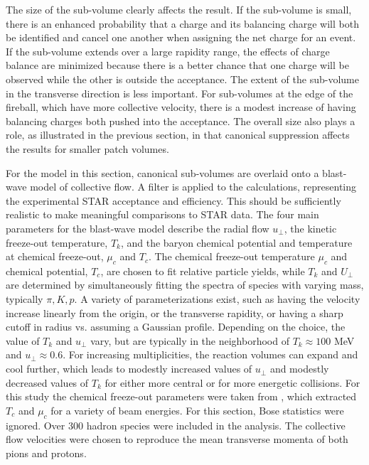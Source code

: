 The size of the sub-volume clearly affects the result. If the sub-volume is small, there is an enhanced probability that a charge and its balancing charge will both be identified and cancel one another when assigning the net charge for an event. If the sub-volume extends over a large rapidity range, the effects of charge balance are minimized because there is a better chance that one charge will be observed while the other is outside the acceptance. The extent of the sub-volume in the transverse direction is less important. For sub-volumes at the edge of the fireball, which have more collective velocity, there is a modest increase of having balancing charges both pushed into the acceptance. The overall size also plays a role, as illustrated in the previous section, in that canonical suppression affects the results for smaller patch volumes. 

For the model in this section, canonical sub-volumes are overlaid onto a blast-wave model of collective flow. A filter is applied to the calculations, representing the experimental STAR acceptance and efficiency. This should be sufficiently realistic to make meaningful comparisons to STAR data. The four main parameters for the blast-wave model describe the radial flow $u_\perp$, the kinetic freeze-out temperature, $T_k$, and the baryon chemical potential and temperature at chemical freeze-out, $\mu_c$ and $T_c$. The chemical freeze-out temperature $\mu_c$ and chemical potential, $T_c$, are chosen to fit relative particle yields, while $T_k$ and $U_\perp$ are determined by simultaneously fitting the spectra of species with varying mass, typically $\pi,K,p$. A variety of parameterizations exist, such as having the velocity increase linearly from the origin, or the transverse rapidity, or having a sharp cutoff in radius vs. assuming a Gaussian profile. Depending on the choice, the value of $T_k$ and $u_\perp$ vary, but are typically in the neighborhood of $T_k\approx 100$ MeV and $u_\perp\approx 0.6$. For increasing multiplicities, the reaction volumes can expand and cool further, which leads to modestly increased values of $u_\perp$ and modestly decreased values of $T_k$ for either more central or for more energetic collisions. For this study the chemical freeze-out parameters were taken from \cite{Das:2012yq,Kumar:2012np}, which extracted $T_c$ and $\mu_c$ for a variety of beam energies. For this section, Bose statistics were ignored. Over 300 hadron species were included in the analysis. The collective flow velocities were chosen to reproduce the mean transverse momenta of both pions and protons.

